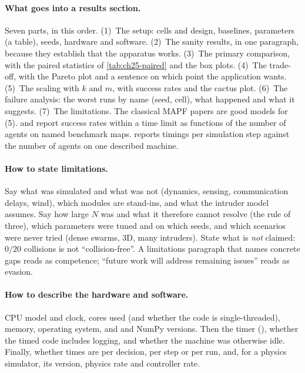 \paragraph{What goes into a results section.}
Seven parts, in this order. (1)~The setup: cells and design, baselines,
parameters (a table), seeds, hardware and software. (2)~The sanity results,
in one paragraph, because they establish that the apparatus works. (3)~The
primary comparison, with the paired statistics of \cref{tab:ch25-paired}
and the box plots. (4)~The trade-off, with the Pareto plot and a sentence
on which point the application wants. (5)~The scaling with $k$ and $m$,
with success rates and the cactus plot. (6)~The failure analysis: the
worst runs by name (seed, cell), what happened and what it suggests.
(7)~The limitations. The classical MAPF papers are good models for (5).
\cbs \cite{sharon2015cbs} and \ecbs \cite{barer2014ecbs} report success
rates within a time limit as functions of the number of agents on named
benchmark maps. \orca \cite{vandenberg2011orca} reports timings per
simulation step against the number of agents on one described machine.

\paragraph{How to state limitations.}
Say what was simulated and what was not (dynamics, sensing, communication
delays, wind), which modules are stand-ins, and what the intruder model
assumes. Say how large $N$ was and what it therefore cannot resolve (the
rule of three), which parameters were tuned and on which seeds, and which
scenarios were never tried (dense swarms, 3D, many intruders). State what is \emph{not}
claimed: $0/20$ collisions is not ``collision-free''. A limitations
paragraph that names concrete gaps reads as competence; ``future work will
address remaining issues'' reads as evasion.

\paragraph{How to describe the hardware and software.}
CPU model and clock, cores used (and whether the code is single-threaded),
memory, operating system, and \python and NumPy versions. Then the timer
(), whether the timed code includes logging, and
whether the machine was otherwise idle. Finally, whether times are per
decision, per step or per run, and, for a physics simulator, its version,
physics rate and controller rate.

